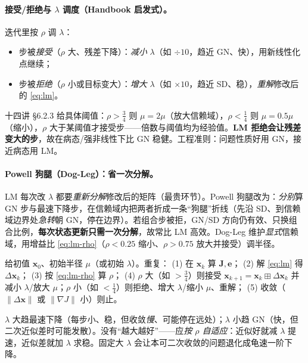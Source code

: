 \paragraph{接受/拒绝与 $\lambda$ 调度（Handbook 启发式）。}\cite{carlone2026handbook,gaoxiang2019slam14}
迭代里按 $\rho$ 调 $\lambda$：
\begin{itemize}
  \item 步被\emph{接受}（$\rho$ 大、残差下降）：\emph{减小} $\lambda$（如 $\div10$，趋近 GN、快），用新线性化点继续；
  \item 步被\emph{拒绝}（$\rho$ 小或目标变大）：\emph{增大} $\lambda$（如 $\times10$，趋近 SD、稳），\emph{重解}修改后的 \cref{eq:lm}。
\end{itemize}
十四讲 §6.2.3 给具体阈值：$\rho>\tfrac34$ 则 $\mu=2\mu$（放大信赖域），$\rho<\tfrac14$ 则 $\mu=0.5\mu$（缩小），$\rho$ 大于某阈值才接受步——倍数与阈值均为经验值。\textbf{LM 拒绝会让残差变大的步}，故在病态/强非线性下比 GN 稳健。工程准则：问题性质好用 GN，接近病态用 LM。

\paragraph{Powell 狗腿（Dog-Leg）：省一次分解。}\cite{carlone2026handbook}
LM 每次改 $\lambda$ 都要\emph{重新分解}修改后的矩阵（最贵环节）。Powell 狗腿改为：\emph{分别}算 GN 步与最速下降步，在信赖域内把两者折成一条“狗腿”折线（先沿 SD、到信赖域边界处\emph{急转}朝 GN，停在边界）。若组合步被拒，GN/SD 方向仍有效、只换组合比例，\textbf{每次状态更新只需一次分解}，故常比 LM 高效。Dog-Leg 维护\emph{显式}信赖域，用增益比 \cref{eq:lm-rho}（$\rho<0.25$ 缩小、$\rho>0.75$ 放大并接受）调半径。

\begin{algo}\label{alg:nlopt-lm}
给初值 $\mathbf{x}_0$、初始半径 $\mu$（或初始 $\lambda$）。重复：
(1) 在 $\mathbf{x}_k$ 算 $\mathbf{J},\mathbf{e}$；
(2) 解 \cref{eq:lm} 得 $\Delta\mathbf{x}_k$；
(3) 按 \cref{eq:lm-rho} 算 $\rho$；
(4) $\rho$ 大（如 $>\tfrac34$）则接受 $\mathbf{x}_{k+1}=\mathbf{x}_k\boxplus\Delta\mathbf{x}_k$ 并减小 $\lambda$/放大 $\mu$；$\rho$ 小（如 $<\tfrac14$）则拒绝、增大 $\lambda$/缩小 $\mu$、重解；
(5) 收敛（$\|\Delta\mathbf{x}\|$ 或 $\|\nabla J\|$ 小）则止。
\end{algo}

\begin{pitfall}
$\lambda$ 大趋最速下降（每步小、稳，但收敛\emph{慢}、可能停在远处）；$\lambda$ 小趋 GN（快，但二次近似差时可能发散）。没有“越大越好”——应\emph{按 $\rho$ 自适应}：近似好就减 $\lambda$ 提速，近似差就加 $\lambda$ 求稳。固定大 $\lambda$ 会让本可二次收敛的问题退化成龟速一阶下降。
\end{pitfall}

